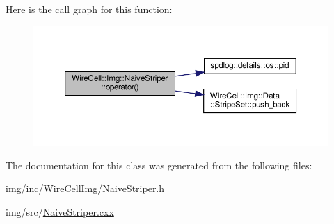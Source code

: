 Here is the call graph for this function\+:
\nopagebreak
\begin{figure}[H]
\begin{center}
\leavevmode
\includegraphics[width=350pt]{class_wire_cell_1_1_img_1_1_naive_striper_a568d56d13dbba3a4351f0ef9f2df43f3_cgraph}
\end{center}
\end{figure}


The documentation for this class was generated from the following files\+:\begin{DoxyCompactItemize}
\item 
img/inc/\+Wire\+Cell\+Img/\hyperlink{_naive_striper_8h}{Naive\+Striper.\+h}\item 
img/src/\hyperlink{_naive_striper_8cxx}{Naive\+Striper.\+cxx}\end{DoxyCompactItemize}
